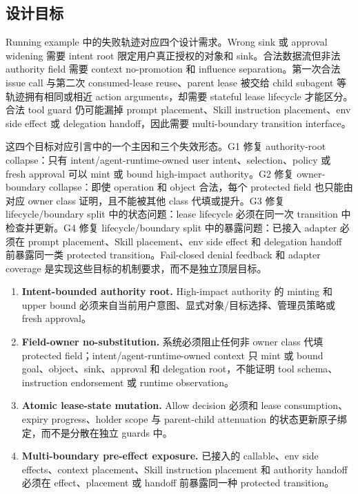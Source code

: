 \documentclass[UTF8,a4paper,11pt]{ctexart}
\begin{document}
\subsection{设计目标}

Running example 中的失败轨迹对应四个设计需求。Wrong sink 或 approval widening 需要 intent root 限定用户真正授权的对象和 sink。合法数据流但非法 authority field 需要 context no-promotion 和 influence separation。第一次合法 issue call 与第二次 consumed-lease reuse、parent lease 被交给 child subagent 等轨迹拥有相同或相近 action arguments，却需要 stateful lease lifecycle 才能区分。合法 tool guard 仍可能漏掉 prompt placement、Skill instruction placement、env side effect 或 delegation handoff，因此需要 multi-boundary transition interface。

这四个目标对应引言中的一个主因和三个失效形态。G1 修复 authority-root collapse：只有 intent/agent-runtime-owned user intent、selection、policy 或 fresh approval 可以 mint 或 bound high-impact authority。G2 修复 owner-boundary collapse：即使 operation 和 object 合法，每个 protected field 也只能由对应 owner class 证明，且不能被其他 class 代填或提升。G3 修复 lifecycle/boundary split 中的状态问题：lease lifecycle 必须在同一次 transition 中检查并更新。G4 修复 lifecycle/boundary split 中的暴露问题：已接入 adapter 必须在 prompt placement、Skill placement、env side effect 和 delegation handoff 前暴露同一类 protected transition。Fail-closed denial feedback 和 adapter coverage 是实现这些目标的机制要求，而不是独立顶层目标。

\begin{enumerate}[leftmargin=*,label=\textbf{G\arabic*.}]
  \item \textbf{Intent-bounded authority root.} High-impact authority 的 minting 和 upper bound 必须来自当前用户意图、显式对象/目标选择、管理员策略或 fresh approval。
  \item \textbf{Field-owner no-substitution.} 系统必须阻止任何非 owner class 代填 protected field；intent/agent-runtime-owned context 只 mint 或 bound goal、object、sink、approval 和 delegation root，不能证明 tool schema、instruction endorsement 或 runtime observation。
  \item \textbf{Atomic lease-state mutation.} Allow decision 必须和 lease consumption、expiry progress、holder scope 与 parent-child attenuation 的状态更新原子绑定，而不是分散在独立 guards 中。
  \item \textbf{Multi-boundary pre-effect exposure.} 已接入的 callable、env side effects、context placement、Skill instruction placement 和 authority handoff 必须在 effect、placement 或 handoff 前暴露同一种 protected transition。
\end{enumerate}
\end{document}
